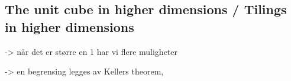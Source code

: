 \documentclass[../thesis.tex]{subfiles}
\begin{document}
\subsection{The unit cube in higher dimensions / Tilings in higher dimensions}
-> når det er større en 1 har vi flere muligheter

-> en begrensing legges av Kellers theorem, 














\end{document}
